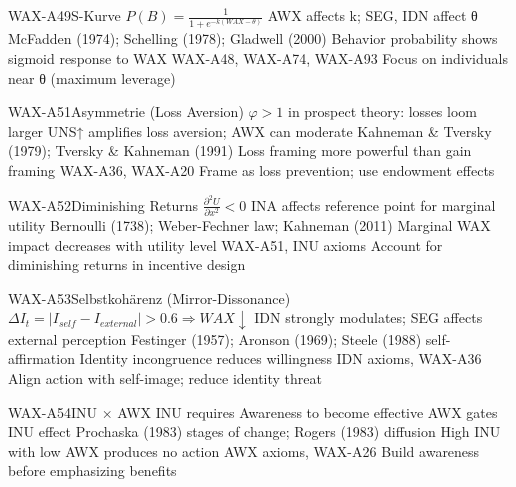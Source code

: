 \begin{axiomspec}{WAX-A49}{S-Kurve}
 $P(B) = \frac{1}{1 + e^{-k(WAX - \theta)}}$
 AWX affects k; SEG, IDN affect θ
 McFadden (1974); Schelling (1978); Gladwell (2000)
 Behavior probability shows sigmoid response to WAX
 WAX-A48, WAX-A74, WAX-A93
 Focus on individuals near θ (maximum leverage)
\end{axiomspec}

\begin{axiomspec}{WAX-A51}{Asymmetrie (Loss Aversion)}
 $\varphi > 1$ in prospect theory: losses loom larger
 UNS↑ amplifies loss aversion; AWX can moderate
 Kahneman \& Tversky (1979); Tversky \& Kahneman (1991)
 Loss framing more powerful than gain framing
 WAX-A36, WAX-A20
 Frame as loss prevention; use endowment effects
\end{axiomspec}

\begin{axiomspec}{WAX-A52}{Diminishing Returns}
 $\frac{\partial^2 U}{\partial x^2} < 0$
 INA affects reference point for marginal utility
 Bernoulli (1738); Weber-Fechner law; Kahneman (2011)
 Marginal WAX impact decreases with utility level
 WAX-A51, INU axioms
 Account for diminishing returns in incentive design
\end{axiomspec}

\begin{axiomspec}{WAX-A53}{Selbstkohärenz (Mirror-Dissonance)}
 $\Delta I_t = |I_{self} - I_{external}| > 0.6 \Rightarrow WAX \downarrow$
 IDN strongly modulates; SEG affects external perception
 Festinger (1957); Aronson (1969); Steele (1988) self-affirmation
 Identity incongruence reduces willingness
 IDN axioms, WAX-A36
 Align action with self-image; reduce identity threat
\end{axiomspec}


\begin{axiomspec}{WAX-A54}{INU × AWX}
 INU requires Awareness to become effective
 AWX gates INU effect
 Prochaska (1983) stages of change; Rogers (1983) diffusion
 High INU with low AWX produces no action
 AWX axioms, WAX-A26
 Build awareness before emphasizing benefits
\end{axiomspec}


